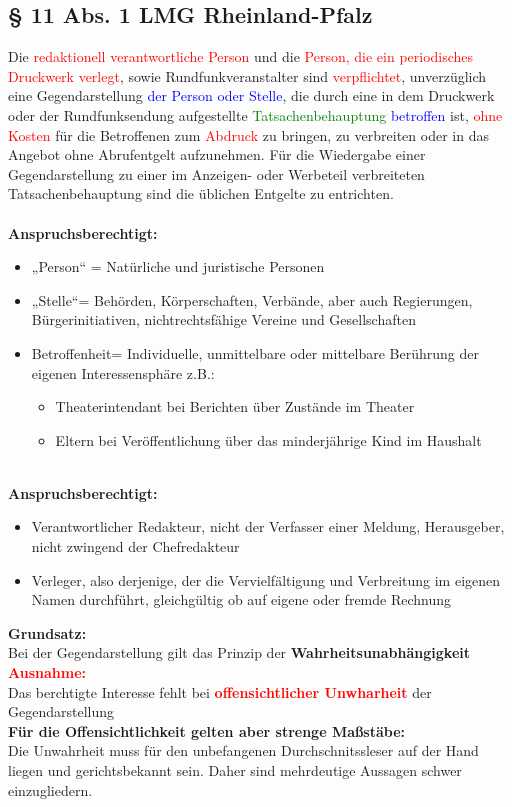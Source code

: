 \subsection{§ 11 Abs. 1 LMG Rheinland-Pfalz}
Die \textcolor{red}{redaktionell verantwortliche Person} und die \textcolor{red}{Person, die ein periodisches Druckwerk verlegt}, sowie Rundfunkveranstalter sind \textcolor{red}{verpflichtet}, unverzüglich eine Gegendarstellung \textcolor{blue}{der Person oder Stelle}, die durch eine in dem Druckwerk oder der Rundfunksendung aufgestellte \textcolor{green}{Tatsachenbehauptung} \textcolor{blue}{betroffen} ist, \textcolor{red}{ohne Kosten} für die Betroffenen zum \textcolor{red}{Abdruck} zu bringen, zu verbreiten oder in das Angebot ohne Abrufentgelt aufzunehmen. Für die Wiedergabe einer Gegendarstellung zu einer im Anzeigen- oder Werbeteil verbreiteten Tatsachenbehauptung sind die üblichen Entgelte zu entrichten.\\
\qquad\\
\textbf{Anspruchsberechtigt:}
\begin{itemize}
    \item „Person“ = Natürliche und juristische Personen
    \item „Stelle“= Behörden, Körperschaften, Verbände, aber auch Regierungen, Bürgerinitiativen, nichtrechtsfähige Vereine und Gesellschaften
    \item Betroffenheit= Individuelle, unmittelbare oder mittelbare Berührung der eigenen Interessensphäre z.B.:
    \begin{itemize}
        \item Theaterintendant bei Berichten über Zustände im Theater
        \item Eltern bei Veröffentlichung über das minderjährige Kind im Haushalt
    \end{itemize}
\end{itemize}
\qquad\\
\textbf{Anspruchsberechtigt:}
\begin{itemize}
    \item Verantwortlicher Redakteur, nicht der Verfasser einer Meldung, Herausgeber, nicht zwingend der Chefredakteur
    \item Verleger, also derjenige, der die Vervielfältigung und Verbreitung im eigenen Namen durchführt, gleichgültig ob auf eigene oder fremde Rechnung
\end{itemize}
\textbf{Grundsatz:}\\
Bei der Gegendarstellung gilt das Prinzip der \textbf{Wahrheitsunabhängigkeit}\\
\textcolor{red}{\textbf{Ausnahme:}}\\
Das berchtigte Interesse fehlt bei \textcolor{red}{\textbf{offensichtlicher Unwharheit}} der Gegendarstellung\\
\textbf{Für die Offensichtlichkeit gelten aber strenge Maßstäbe:}\\
Die Unwahrheit muss für den unbefangenen Durchschnitssleser auf der Hand liegen und gerichtsbekannt sein. Daher sind mehrdeutige Aussagen schwer einzugliedern. 

